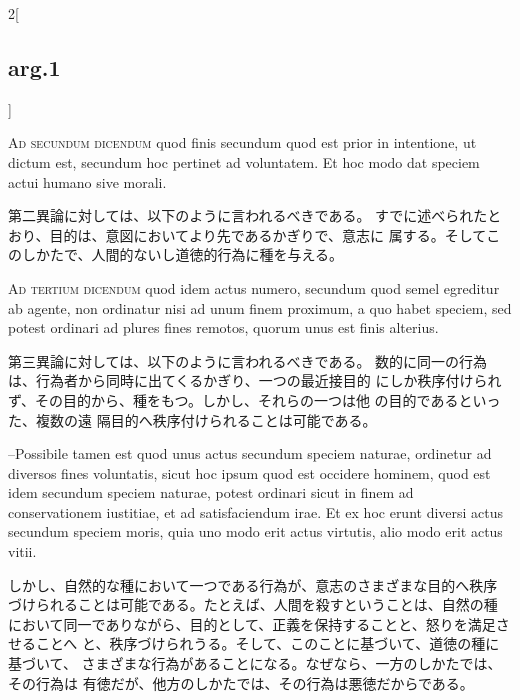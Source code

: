 \documentclass[paper=a4paper,fontsize=10pt,jafontsize=9pt,titlepage]{jlreq}
\begin{document}
\begin{paracol}{2}[\subsection{arg.1}]
\switchcolumn*[\subsection{ad.2}]

{\scshape Ad secundum dicendum} quod finis secundum
quod est prior in intentione, ut dictum est, secundum hoc pertinet ad
voluntatem. Et hoc modo dat speciem actui humano sive morali.

\switchcolumn

第二異論に対しては、以下のように言われるべきである。
すでに述べられたとおり、目的は、意図においてより先であるかぎりで、意志に
 属する。そしてこのしかたで、人間的ないし道徳的行為に種を与える。

\switchcolumn*[\subsection{ad.3}]

{\scshape Ad tertium dicendum} quod idem actus
numero, secundum quod semel egreditur ab agente, non ordinatur nisi ad
unum finem proximum, a quo habet speciem, sed potest ordinari ad plures
fines remotos, quorum unus est finis alterius.

\switchcolumn

第三異論に対しては、以下のように言われるべきである。
数的に同一の行為は、行為者から同時に出てくるかぎり、一つの最近接目的
 にしか秩序付けられず、その目的から、種をもつ。しかし、それらの一つは他
 の目的であるといった、複数の遠
 隔目的へ秩序付けられることは可能である。

\switchcolumn*

--Possibile tamen est quod
unus actus secundum speciem naturae, ordinetur ad diversos fines
voluntatis, sicut hoc ipsum quod est occidere hominem, quod est idem
secundum speciem naturae, potest ordinari sicut in finem ad
conservationem iustitiae, et ad satisfaciendum irae. Et ex hoc erunt
diversi actus secundum speciem moris, quia uno modo erit actus virtutis,
alio modo erit actus vitii.

\switchcolumn

しかし、自然的な種において一つである行為が、意志のさまざまな目的へ秩序
 づけられることは可能である。たとえば、人間を殺すということは、自然の種
 において同一でありながら、目的として、正義を保持することと、怒りを満足させることへ
 と、秩序づけられうる。そして、このことに基づいて、道徳の種に基づいて、
 さまざまな行為があることになる。なぜなら、一方のしかたでは、その行為は
 有徳だが、他方のしかたでは、その行為は悪徳だからである。


\end{paracol}
\end{document}
